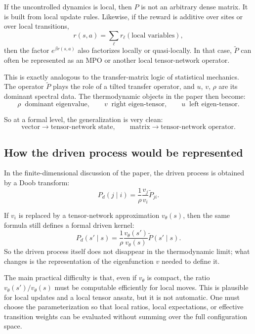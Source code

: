 \documentclass[11pt]{article}
\begin{document}
If the uncontrolled dynamics is local, then \(P\) is not an arbitrary dense matrix. It is built
from local update rules. Likewise, if the reward is additive over sites or over local
transitions,
\begin{equation}
    r(s,a)=\sum_{\ell} r_\ell(\text{local variables}),
\end{equation}
then the factor \(e^{\beta r(s,a)}\) also factorizes locally or quasi-locally. In that case,
\(\widetilde P\) can often be represented as an MPO or another local tensor-network operator.

This is exactly analogous to the transfer-matrix logic of statistical mechanics. The operator
\(\widetilde P\) plays the role of a tilted transfer operator, and \(u\), \(v\), \(\rho\) are
its dominant spectral data. The thermodynamic objects in the paper then become:
\begin{equation}
    \rho \;\; \text{dominant eigenvalue},\qquad
    v \;\; \text{right eigen-tensor},\qquad
    u \;\; \text{left eigen-tensor}.
\end{equation}

So at a formal level, the generalization is very clean:
\begin{equation}
    \text{vector} \to \text{tensor-network state},
    \qquad
    \text{matrix} \to \text{tensor-network operator}.
\end{equation}

\subsection*{How the driven process would be represented}

In the finite-dimensional discussion of the paper, the driven process is obtained by a Doob
transform:
\begin{equation}
    P_d(j\mid i)=\frac{1}{\rho}\frac{v_j}{v_i}\widetilde P_{ji}.
\end{equation}

If \(v_i\) is replaced by a tensor-network approximation \(v_\theta(s)\), then the same formula
still defines a formal driven kernel:
\begin{equation}
    P_d(s'\mid s)=\frac{1}{\rho}\frac{v_\theta(s')}{v_\theta(s)}\widetilde P(s'\mid s).
\end{equation}
So the driven process itself does not disappear in the thermodynamic limit; what changes is the
representation of the eigenfunction \(v\) needed to define it.

The main practical difficulty is that, even if \(v_\theta\) is compact, the ratio
\(v_\theta(s')/v_\theta(s)\) must be computable efficiently for local moves. This is plausible
for local updates and a local tensor ansatz, but it is not automatic. One must choose the
parameterization so that local ratios, local expectations, or effective transition weights can
be evaluated without summing over the full configuration space.
\end{document}
